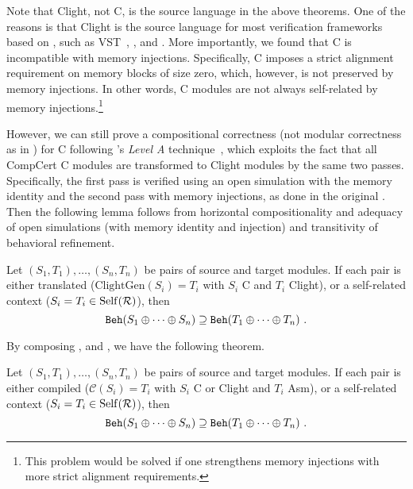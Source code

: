 Note that \textrm{Clight}, not \textrm{\cc{} C}, is the source language in the above theorems.  One of the
reasons is that \textrm{Clight} is the source language for most verification frameworks based on
\cc{}, such as VST~\cite{VST}, \ccc{}, and \ccx{}.  More importantly, we found that
\textrm{\cc{} C} is incompatible with memory injections.  Specifically,
\textrm{\cc{} C} imposes a strict alignment requirement on memory blocks of size zero, which, however,
is not preserved by memory injections.
In other words, \textrm{\cc{} C} modules are not always self-related by memory injections.\footnote{This problem
  would be solved if one strengthens memory injections with more strict alignment requirements.}

However, we can still prove a compositional correctness (not modular correctness as in ) for \textrm{\cc{} C}
following \scc{}'s \emph{Level A} technique~\cite{kang:scc},
which exploits the fact that all \textrm{CompCert C} modules are transformed to \textrm{Clight} modules
by the same two passes.
Specifically, the first pass is verified using an open simulation with the memory identity
and the second pass with memory injections, as done in the original \cc{}.
Then the following lemma follows from horizontal compositionality and adequacy of
open simulations (with memory identity and injection) and transitivity of behavioral refinement.

\begin{lemma} \label{thm:results-clightgen}
  Let $(S_1,T_1), \ldots, (S_n,T_n)$ be pairs of source and target modules.
  If each pair is either translated (\ie $\textrm{ClightGen}(S_i) = T_i$ with $S_i$ \textrm{\cc{} C} and $T_i$ \textrm{Clight}), or a self-related context (\ie $S_i = T_i \in \mathrm{Self}(\mathcal{R})$), then
  \[
    \mathtt{Beh}({S_1 \oplus \cdots \oplus S_n}) \supseteq \mathtt{Beh}({T_1 \oplus \cdots \oplus T_n})~.
  \]
\end{lemma}



By composing ,  and , we have the following theorem.
\begin{theorem} \label{thm:results-compiler2}
  Let $(S_1,T_1), \ldots, (S_n,T_n)$ be pairs of source and target modules.
  If each pair is either compiled (\ie $\mathcal{C}(S_i) = T_i$ with $S_i$ \textrm{\cc{} C} or \textrm{Clight} and $T_i$ \textrm{Asm}), or a self-related context (\ie $S_i = T_i \in \mathrm{Self}(\mathcal{R})$), then
  \[
    \mathtt{Beh}({S_1 \oplus \cdots \oplus S_n}) \supseteq \mathtt{Beh}({T_1 \oplus \cdots \oplus T_n})~.
  \]
\end{theorem}



